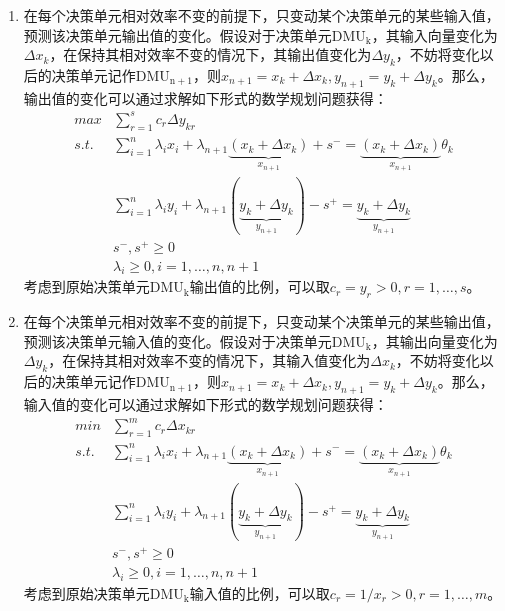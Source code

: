 \begin{enumerate}[（1）]
  \item 在每个决策单元相对效率不变的前提下，只变动某个决策单元的某些输入值，预测该决策单元输出值的变化。假设对于决策单元$\mathrm{DMU_k}$，其输入向量变化为$\Delta x_k$，在保持其相对效率不变的情况下，其输出值变化为$\Delta y_k$，不妨将变化以后的决策单元记作$\mathrm{DMU_{n+1}}$，则$x_{n+1} = x_k + \Delta x_k, y_{n+1} = y_k + \Delta y_k$。那么，输出值的变化可以通过求解如下形式的数学规划问题获得：
\begin{equation}
  \begin{array}{ll}
    \textit{max} & \sum\limits_{r = 1}^s c_r \Delta y_{kr} \\
    \textit{s.t.} & \sum\limits_{i=1}^n \lambda_i x_i + \lambda_{n+1} \underbrace{(x_k + \Delta x_k)}_{x_{n+1}} + s^{-} = \underbrace{(x_k + \Delta x_k)}_{x_{n+1}} \theta_k\\
     & \sum\limits_{i=1}^n \lambda_i y_i + \lambda_{n+1} (\underbrace{y_k + \Delta y_k}_{y_{n+1}}) - s^{+} = \underbrace{y_k + \Delta y_k}_{y_{n+1}}\\
     & s^{-}, s^{+} \ge 0 \\
     & \lambda_i \ge 0, i = 1,\ldots, n, n+1
  \end{array}
\end{equation}
考虑到原始决策单元$\mathrm{DMU_k}$输出值的比例，可以取$c_r = y_r >0, r = 1,\ldots, s$。
  \item 在每个决策单元相对效率不变的前提下，只变动某个决策单元的某些输出值，预测该决策单元输入值的变化。假设对于决策单元$\mathrm{DMU_k}$，其输出向量变化为$\Delta y_k$，在保持其相对效率不变的情况下，其输入值变化为$\Delta x_k$，不妨将变化以后的决策单元记作$\mathrm{DMU_{n+1}}$，则$x_{n+1} = x_k + \Delta x_k, y_{n+1} = y_k + \Delta y_k$。那么，输入值的变化可以通过求解如下形式的数学规划问题获得：
\begin{equation}
  \begin{array}{ll}
    \textit{min} & \sum\limits_{r = 1}^m c_r \Delta x_{kr} \\
    \textit{s.t.} & \sum\limits_{i=1}^n \lambda_i x_i + \lambda_{n+1} \underbrace{(x_k + \Delta x_k)}_{x_{n+1}} + s^{-} = \underbrace{(x_k + \Delta x_k)}_{x_{n+1}} \theta_k\\
     & \sum\limits_{i=1}^n \lambda_i y_i + \lambda_{n+1} (\underbrace{y_k + \Delta y_k}_{y_{n+1}}) - s^{+} = \underbrace{y_k + \Delta y_k}_{y_{n+1}}\\
     & s^{-}, s^{+} \ge 0 \\
     & \lambda_i \ge 0, i = 1,\ldots, n, n+1
  \end{array}
\end{equation}
考虑到原始决策单元$\mathrm{DMU_k}$输入值的比例，可以取$c_r = 1/x_r >0, r = 1,\ldots, m$。
\end{enumerate}

